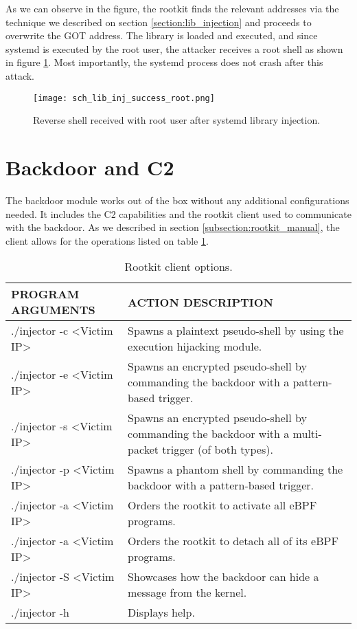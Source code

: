 As we can observe in the figure, the rootkit finds the relevant addresses via the technique we described on section \ref{section:lib_injection} and proceeds to overwrite the GOT address. The library is loaded and executed, and since systemd is executed by the root user, the attacker receives a root shell as shown in figure \ref{fig:lib_inj_success_root}. Most importantly, the systemd process does not crash after this attack.

\begin{figure}[htbp]
	\centering
	\texttt{[image: sch\_lib\_inj\_success\_root.png]}
	\caption{Reverse shell received with root user after systemd library injection.}
	\label{fig:lib_inj_success_root}
\end{figure}


\section{Backdoor and C2}
The backdoor module works out of the box without any additional configurations needed. It includes the C2 capabilities and the rootkit client used to communicate with the backdoor. As we described in section \ref{subsection:rootkit_manual}, the client allows for the operations listed on table \ref{table:rootkit_client_actions}.

\begin{table}[htbp]
\begin{tabular}{|>{\centering\arraybackslash}p{5cm}|>{\centering\arraybackslash}p{9.5cm}|}
\hline
\textbf{PROGRAM ARGUMENTS} & \textbf{ACTION DESCRIPTION}\\
\hline
\hline
./injector -c <Victim IP> & Spawns a plaintext pseudo-shell by using the execution hijacking module.\\
\hline
./injector -e <Victim IP> & Spawns an encrypted pseudo-shell by commanding the backdoor with a pattern-based trigger.\\
\hline
./injector -s <Victim IP> & Spawns an encrypted pseudo-shell by commanding the backdoor with a multi-packet trigger (of both types).\\
\hline
./injector -p <Victim IP> & Spawns a phantom shell by commanding the backdoor with a pattern-based trigger.\\
\hline
./injector -a <Victim IP> & Orders the rootkit to activate all eBPF programs.\\
\hline
./injector -a <Victim IP> & Orders the rootkit to detach all of its eBPF programs.\\
\hline
./injector -S <Victim IP> & Showcases how the backdoor can hide a message from the kernel.\\
\hline
./injector -h & Displays help.\\
\hline
\end{tabular}
\caption{Rootkit client options.}
\label{table:rootkit_client_actions}
\end{table}

